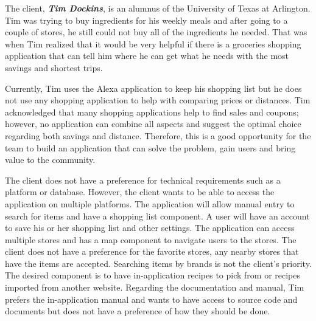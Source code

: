 The client, \textbf{\emph{Tim Dockins}}, is an alumnus of the University of Texas at Arlington. Tim was trying to buy ingredients for his weekly meals and after going to a couple of stores, he still could not buy all of the ingredients he needed. That was when Tim realized that it would be very helpful if there is a groceries shopping application that can tell him where he can get what he needs with the most savings and shortest trips. 

Currently, Tim uses the Alexa application to keep his shopping list but he does not use any shopping application to help with comparing prices or distances. Tim acknowledged that many shopping applications help to find sales and coupons; however, no application can combine all aspects and suggest the optimal choice regarding both savings and distance. Therefore, this is a good opportunity for the team to build an application that can solve the problem, gain users and bring value to the community. 

The client does not have a preference for technical requirements such as a platform or database. However, the client wants to be able to access the application on multiple platforms. The application will allow manual entry to search for items and have a shopping list component. A user will have an account to save his or her shopping list and other settings. The application can access multiple stores and has a map component to navigate users to the stores. The client does not have a preference for the favorite stores, any nearby stores that have the items are accepted. Searching items by brands is not the client's priority. The desired component is to have in-application recipes to pick from or recipes imported from another website. Regarding the documentation and manual, Tim prefers the in-application manual and wants to have access to source code and documents but does not have a preference of how they should be done.
